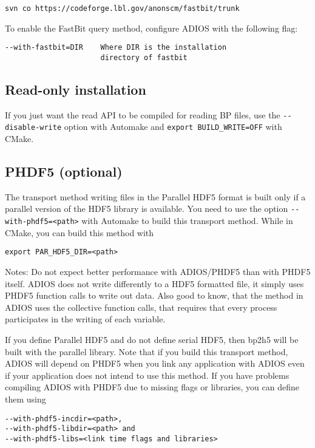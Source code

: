 \begin{lstlisting}[language={}]
svn co https://codeforge.lbl.gov/anonscm/fastbit/trunk
\end{lstlisting}

\noindent To enable the FastBit query method, configure ADIOS with the following flag:
\begin{lstlisting}
--with-fastbit=DIR    Where DIR is the installation
                      directory of fastbit
\end{lstlisting}




\subsection{Read-only installation}

If you just want the read API to be compiled for reading BP files, use the \verb+--disable-write+ option with Automake and \verb+export BUILD_WRITE=OFF+ with CMake.

\subsection{PHDF5 (optional)}

The transport method writing files in the Parallel HDF5 format is built only if
a parallel version of the HDF5 library is available. You need to use the
option \verb+--with-phdf5=<path>+ with Automake to build this transport method.
While in CMake, you can build this method with
\begin{lstlisting}
export PAR_HDF5_DIR=<path>
\end{lstlisting}

\noindent Notes: Do not expect better performance with ADIOS/PHDF5 than with PHDF5 itself. ADIOS does not write differently to a HDF5 formatted file, it simply uses PHDF5 function calls to write out data. Also good to know, that the method in ADIOS uses the collective function calls, that requires that every process participates in the writing of each variable.

If you define Parallel HDF5 and do not define serial HDF5, then bp2h5 will be built
with the parallel library.
Note that if you build this transport method, ADIOS will depend on PHDF5 when you
link any application with ADIOS even if your application does not intend to
use this method.
If you have problems compiling ADIOS with PHDF5 due to missing flags or libraries,
you can define them using

\begin{lstlisting}
--with-phdf5-incdir=<path>,
--with-phdf5-libdir=<path> and
--with-phdf5-libs=<link time flags and libraries>
\end{lstlisting}

